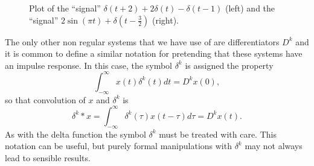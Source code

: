 \begin{figure}[tp]
\centering
{} 
\;\;
\caption{Plot of the ``signal'' $\delta(t+2) + 2\delta(t) - \delta(t-1)$ (left) and the ``signal'' $2\sin(\pi t) + \delta(t - \tfrac{3}{2})$ (right).} \label{fig:deltafuncplotexample}
\end{figure}

The only other non regular systems that we have use of are differentiators $D^k$ and it is common to define a similar notation for pretending that these systems have an impulse response.  In this case, the symbol $\delta^k$ is assigned the property
\[
\int_{-\infty}^\infty x(t) \delta^k(t) dt = D^k x(0),
\]
so that convolution of $x$ and $\delta^k$ is
\[
\delta^k * x = \int_{-\infty}^{\infty} \delta^k(\tau) x(t - \tau) d\tau = D^kx(t).
\]
As with the delta function the symbol $\delta^k$ must be treated with care.  This notation can be useful, but purely formal manipulations with $\delta^k$ may not always lead to sensible results.

